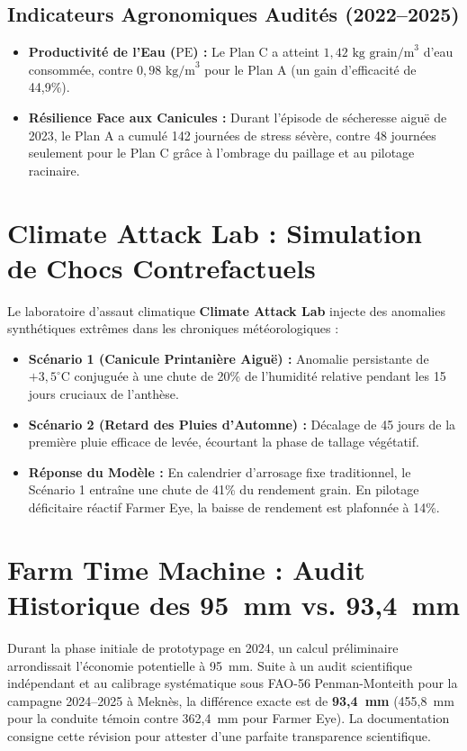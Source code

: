 \documentclass[11pt,a4paper,oneside]{report}
\begin{document}
\subsection{Indicateurs Agronomiques Audités (2022–2025)}
\begin{itemize}[leftmargin=*]
    \item \textbf{Productivité de l'Eau ($\text{PE}$) :} Le Plan C a atteint $1,42\text{ kg grain/m}^3$ d'eau consommée, contre $0,98\text{ kg/m}^3$ pour le Plan A (un gain d'efficacité de 44,9\%).
    \item \textbf{Résilience Face aux Canicules :} Durant l'épisode de sécheresse aiguë de 2023, le Plan A a cumulé 142 journées de stress sévère, contre 48 journées seulement pour le Plan C grâce à l'ombrage du paillage et au pilotage racinaire.
\end{itemize}

\section{Climate Attack Lab : Simulation de Chocs Contrefactuels}
Le laboratoire d'assaut climatique \textbf{Climate Attack Lab} injecte des anomalies synthétiques extrêmes dans les chroniques météorologiques :
\begin{itemize}[leftmargin=*]
    \item \textbf{Scénario 1 (Canicule Printanière Aiguë) :} Anomalie persistante de $+3,5^\circ\text{C}$ conjuguée à une chute de 20\% de l'humidité relative pendant les 15 jours cruciaux de l'anthèse.
    \item \textbf{Scénario 2 (Retard des Pluies d'Automne) :} Décalage de 45 jours de la première pluie efficace de levée, écourtant la phase de tallage végétatif.
    \item \textbf{Réponse du Modèle :} En calendrier d'arrosage fixe traditionnel, le Scénario 1 entraîne une chute de 41\% du rendement grain. En pilotage déficitaire réactif Farmer Eye, la baisse de rendement est plafonnée à 14\%.
\end{itemize}

\section{Farm Time Machine : Audit Historique des 95~mm vs. 93,4~mm}
Durant la phase initiale de prototypage en 2024, un calcul préliminaire arrondissait l'économie potentielle à 95~mm. Suite à un audit scientifique indépendant et au calibrage systématique sous FAO-56 Penman-Monteith pour la campagne 2024–2025 à Meknès, la différence exacte est de \textbf{93,4~mm} (455,8~mm pour la conduite témoin contre 362,4~mm pour Farmer Eye). La documentation consigne cette révision pour attester d'une parfaite transparence scientifique.
\end{document}
